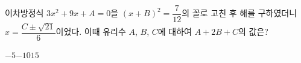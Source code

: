 이차방정식 $3x^2+9x+A=0$을 $(x+B)^2=\dfrac{7}{12}$의 꼴로 고친 후 해를 구하였더니 $x=\dfrac{C\pm\sqrt{21}}{6}$이었다. 이때 유리수 $A$, $B$, $C$에 대하여 $A+2B+C$의 값은?
\begin{choices32}{$-5$}{$-1$}{$0$}{$1$}{$5$}\end{choices32}
